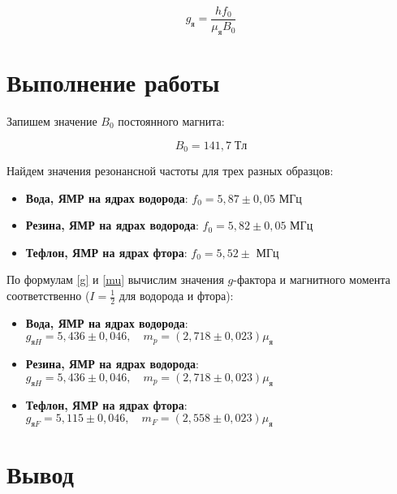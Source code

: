 \documentclass[12pt]{kiarticle}
\begin{document}
	\begin{equation}\label{g}
	g_{я} = \dfrac{hf_0}{\mu_я B_0} 
	\end{equation}

	
	\section{Выполнение работы}
	
	Запишем значение $ B_0 $ постоянного магнита:
	
	\begin{equation}\label{}
	B_0 = 141,7 \; Тл
	\end{equation} 
	
	Найдем значения резонансной частоты для трех разных образцов:
	
	\begin{itemize}
		\item \textbf{Вода, ЯМР на ядрах водорода}: $ f_0 = 5,87 \pm 0,05 $ МГц
			
		\item \textbf{Резина, ЯМР на ядрах водорода}: $ f_0 = 5,82 \pm 0,05 $ МГц
			
		\item \textbf{Тефлон, ЯМР на ядрах фтора}: $ f_0 = 5,52 \pm $ МГц
	\end{itemize}
	
	По формулам \eqref{g} и \eqref{mu} вычислим значения $ g $-фактора и магнитного момента соответственно ($ I = \frac{1}{2} $ для водорода и фтора): 
	
	\begin{itemize}
		\item \textbf{Вода, ЯМР на ядрах водорода}: $ g_{яH} = 5,436 \pm 0,046, \quad m_p  = (2,718 \pm 0,023)\mu_я $ 
		
		\item \textbf{Резина, ЯМР на ядрах водорода}: $ g_{яH} = 5,436 \pm 0,046, \quad m_p   = (2,718 \pm 0,023)\mu_я  $ 
		
		\item \textbf{Тефлон, ЯМР на ядрах фтора}: $ g_{яF} = 5,115 \pm 0,046, \quad m_F  = (2,558 \pm 0,023)\mu_я  $ 
	\end{itemize}
	
	\section{Вывод}
	
\end{document}
